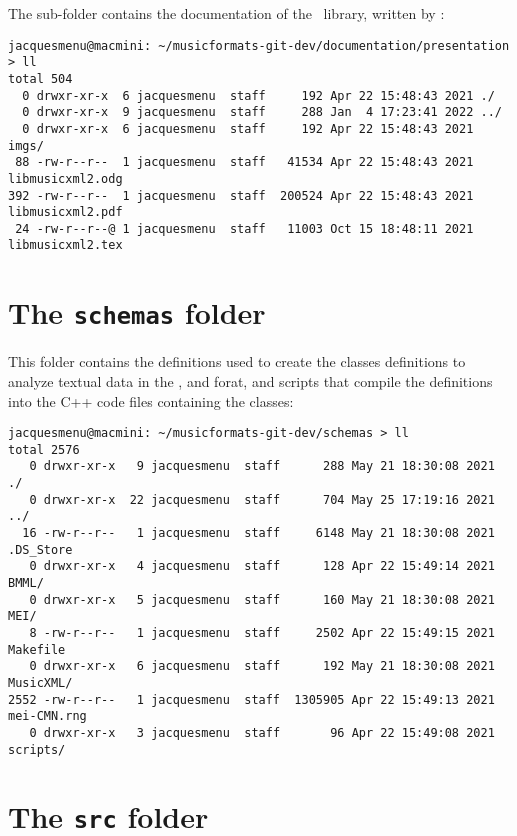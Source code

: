 The  sub-folder contains the documentation of the \libmusicxml\ library, written by \fober:
\begin{lstlisting}[language=Terminal]
jacquesmenu@macmini: ~/musicformats-git-dev/documentation/presentation > ll
total 504
  0 drwxr-xr-x  6 jacquesmenu  staff     192 Apr 22 15:48:43 2021 ./
  0 drwxr-xr-x  9 jacquesmenu  staff     288 Jan  4 17:23:41 2022 ../
  0 drwxr-xr-x  6 jacquesmenu  staff     192 Apr 22 15:48:43 2021 imgs/
 88 -rw-r--r--  1 jacquesmenu  staff   41534 Apr 22 15:48:43 2021 libmusicxml2.odg
392 -rw-r--r--  1 jacquesmenu  staff  200524 Apr 22 15:48:43 2021 libmusicxml2.pdf
 24 -rw-r--r--@ 1 jacquesmenu  staff   11003 Oct 15 18:48:11 2021 libmusicxml2.tex
\end{lstlisting}


\section{The {\tt schemas} folder}

This folder contains the definitions used to create the classes definitions to analyze textual data in the \mxml, \mei and \bmml forat, and  scripts that compile the definitions into the C++ code files containing the classes:
\begin{lstlisting}[language=Terminal]
jacquesmenu@macmini: ~/musicformats-git-dev/schemas > ll
total 2576
   0 drwxr-xr-x   9 jacquesmenu  staff      288 May 21 18:30:08 2021 ./
   0 drwxr-xr-x  22 jacquesmenu  staff      704 May 25 17:19:16 2021 ../
  16 -rw-r--r--   1 jacquesmenu  staff     6148 May 21 18:30:08 2021 .DS_Store
   0 drwxr-xr-x   4 jacquesmenu  staff      128 Apr 22 15:49:14 2021 BMML/
   0 drwxr-xr-x   5 jacquesmenu  staff      160 May 21 18:30:08 2021 MEI/
   8 -rw-r--r--   1 jacquesmenu  staff     2502 Apr 22 15:49:15 2021 Makefile
   0 drwxr-xr-x   6 jacquesmenu  staff      192 May 21 18:30:08 2021 MusicXML/
2552 -rw-r--r--   1 jacquesmenu  staff  1305905 Apr 22 15:49:13 2021 mei-CMN.rng
   0 drwxr-xr-x   3 jacquesmenu  staff       96 Apr 22 15:49:08 2021 scripts/
\end{lstlisting}


\section{The {\tt src} folder}

